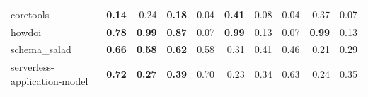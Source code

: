 \documentclass[submit,noauthor,ses,dvipdfmx]{ipsj}
\begin{document}
\begin{table}[t]
{\begin{tabular}{l||p{4em}|p{4em}|p{4em}||p{4em}|p{4em}|p{4em}||p{4em}|p{4em}|p{4em}}
            coretools & \multicolumn{1}{r|}{\textbf{0.14}} & \multicolumn{1}{r|}{0.24} & \multicolumn{1}{r||}{\textbf{0.18}} & \multicolumn{1}{r|}{0.04} & \multicolumn{1}{r|}{\textbf{0.41}} & \multicolumn{1}{r||}{0.08} & \multicolumn{1}{r|}{0.04} & \multicolumn{1}{r|}{0.37} & \multicolumn{1}{r}{0.07} \\
            howdoi & \multicolumn{1}{r|}{\textbf{0.78}} & \multicolumn{1}{r|}{\textbf{0.99}} & \multicolumn{1}{r||}{\textbf{0.87}} & \multicolumn{1}{r|}{0.07} & \multicolumn{1}{r|}{\textbf{0.99}} & \multicolumn{1}{r||}{0.13} & \multicolumn{1}{r|}{0.07} & \multicolumn{1}{r|}{\textbf{0.99}} & \multicolumn{1}{r}{0.13} \\
            schema\_salad & \multicolumn{1}{r|}{\textbf{0.66}} & \multicolumn{1}{r|}{\textbf{0.58}} & \multicolumn{1}{r||}{\textbf{0.62}} & \multicolumn{1}{r|}{0.58} & \multicolumn{1}{r|}{0.31} & \multicolumn{1}{r||}{0.41} & \multicolumn{1}{r|}{0.46} & \multicolumn{1}{r|}{0.21} & \multicolumn{1}{r}{0.29} \\
            serverless-application-model & \multicolumn{1}{r|}{\textbf{0.72}} & \multicolumn{1}{r|}{\textbf{0.27}} & \multicolumn{1}{r||}{\textbf{0.39}} & \multicolumn{1}{r|}{0.70} & \multicolumn{1}{r|}{0.23} & \multicolumn{1}{r||}{0.34} & \multicolumn{1}{r|}{0.63} & \multicolumn{1}{r|}{0.24} & \multicolumn{1}{r}{0.35} \\
            \hline

\end{tabular}}
\end{table}
\end{document}
